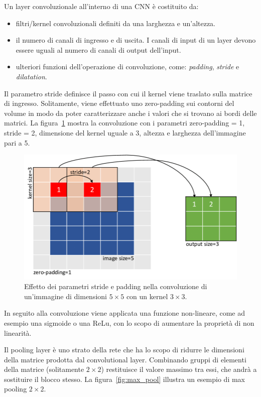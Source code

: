 \documentclass[12pt,a4paper,titlepage]{article}
\begin{document}
Un layer convoluzionale all'interno di una CNN è costituito da: 
\begin{itemize}
\item filtri/kernel convoluzionali definiti da una larghezza e un'altezza. 
\item il numero di canali di ingresso e di uscita. I canali di input di un layer devono essere uguali al numero di canali di output dell'input. 
\item ulteriori funzioni dell'operazione di convoluzione, come: \textit{padding}, \textit{stride} e \textit{dilatation}.
\end{itemize}

Il parametro stride definisce il passo con cui il kernel viene traslato sulla matrice di ingresso. Solitamente, viene effettuato uno zero-padding sui contorni del volume in modo da poter caratterizzare anche i valori che si trovano ai bordi delle matrici. La figura~\ref{fig:padding_stride} mostra la convoluzione con i parametri zero-padding = 1, stride = 2, dimensione del kernel uguale a 3, altezza e larghezza dell'immagine pari a 5.

\begin{figure}[h]
	\centering	
	\includegraphics[width=1\textwidth]{Immagini/padding_stride}
	\caption{Effetto dei parametri stride e padding nella convoluzione di un'immagine di dimensioni $5 \times 5$ con un kernel $3 \times 3$.}
	\label{fig:padding_stride}
\end{figure}

In seguito alla convoluzione viene applicata una funzione non-lineare, come ad esempio una sigmoide o una ReLu, con lo scopo di aumentare la proprietà di non linearità. 

Il pooling layer è uno strato della rete che ha lo scopo di ridurre le dimensioni della matrice prodotta dal convolutional layer. Combinando gruppi di elementi della matrice (solitamente $2 \times 2$) restituisce il valore massimo tra essi, che andrà a sostituire il blocco stesso. La figura~\ref{fig:max_pool} illustra un esempio di max pooling $2 \times 2$.
\end{document}
